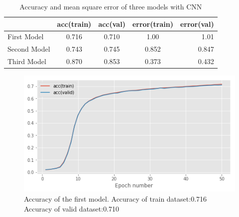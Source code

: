 \documentclass{article}
\begin{document}
\begin{table}[h]
\vskip 3mm
\begin{center}
\begin{small}
\begin{sc}
\begin{tabular}{lcccr}
\hline
\abovespace\belowspace
&acc(train) & acc(val) & error(train) & error(val) \\
\hline
\abovespace
First Model     & 0.716      & 0.710           & 1.00        & 1.01             \\ \hline
Second Model & 0.743      & 0.745          & 0.852       & 0.847              \\ \hline
Third Model    & 0.870      & 0.853          & 0.373        & 0.432              \\
\hline
\end{tabular}
\end{sc}
\end{small}
\caption{Accuracy and mean square error of three models with CNN}
\label{tab:sample-table}
\end{center}
\vskip -3mm
\end{table}

\begin{figure}[h]
\vskip 5mm
\begin{center}
\centerline{\includegraphics[width=\columnwidth]{k.jpg}}
\caption{Accuracy of the first model. \n
Accuracy of train dataset:0.716 \n
Accuracy of valid dataset:0.710
}
\end{center}
\vskip -5mm
\end{figure}
\end{document}
